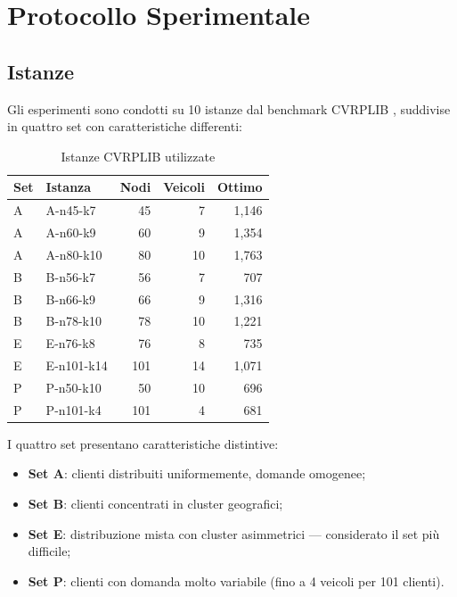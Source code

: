 \chapter{Protocollo Sperimentale}

\section{Istanze}

Gli esperimenti sono condotti su 10 istanze dal benchmark CVRPLIB \cite{cvrplib}, suddivise in quattro
set con caratteristiche differenti:

\begin{table}[H]
\centering
\caption{Istanze CVRPLIB utilizzate}
\label{tab:instances}
\begin{tabular}{@{}llrrr@{}}
\toprule
\textbf{Set} & \textbf{Istanza} & \textbf{Nodi} & \textbf{Veicoli} & \textbf{Ottimo} \\
\midrule
A & A-n45-k7  & 45  &  7 & 1{,}146 \\
A & A-n60-k9  & 60  &  9 & 1{,}354 \\
A & A-n80-k10 & 80  & 10 & 1{,}763 \\
\midrule
B & B-n56-k7  & 56  &  7 &   707 \\
B & B-n66-k9  & 66  &  9 & 1{,}316 \\
B & B-n78-k10 & 78  & 10 & 1{,}221 \\
\midrule
E & E-n76-k8  & 76  &  8 &   735 \\
E & E-n101-k14& 101 & 14 & 1{,}071 \\
\midrule
P & P-n50-k10 & 50  & 10 &   696 \\
P & P-n101-k4 & 101 &  4 &   681 \\
\bottomrule
\end{tabular}
\end{table}

I quattro set presentano caratteristiche distintive:
\begin{itemize}
    \item \textbf{Set A}: clienti distribuiti uniformemente, domande omogenee;
    \item \textbf{Set B}: clienti concentrati in cluster geografici;
    \item \textbf{Set E}: distribuzione mista con cluster asimmetrici ---
          considerato il set pi\`u difficile;
    \item \textbf{Set P}: clienti con domanda molto variabile (fino a 4 veicoli
          per 101 clienti).
\end{itemize}

